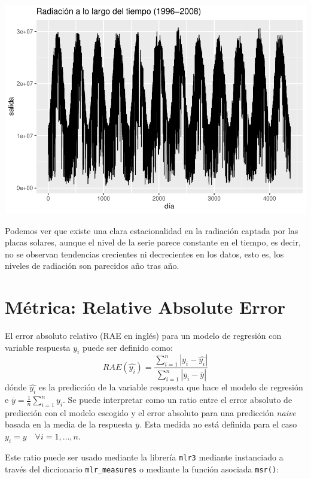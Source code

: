\documentclass[
  11pt,
  a4paper,
]{article}
\newenvironment{Shaded}{\begin{snugshade}}{\end{snugshade}}
\newcommand{\FunctionTok}[1]{\textcolor[rgb]{0.00,0.00,0.00}{#1}}
\newcommand{\NormalTok}[1]{#1}
\newcommand{\OtherTok}[1]{\textcolor[rgb]{0.56,0.35,0.01}{#1}}
\newcommand{\SpecialCharTok}[1]{\textcolor[rgb]{0.00,0.00,0.00}{#1}}
\newcommand{\StringTok}[1]{\textcolor[rgb]{0.31,0.60,0.02}{#1}}
\begin{document}
\includegraphics{memoria_practica_1_files/figure-latex/unnamed-chunk-9-1.pdf}

Podemos ver que existe una clara estacionalidad en la radiación captada
por las placas solares, aunque el nivel de la serie parece constante en
el tiempo, es decir, no se observan tendencias crecientes ni
decrecientes en los datos, esto es, los niveles de radiación son
parecidos año tras año.

\section{Métrica: Relative Absolute Error}

El error absoluto relativo (RAE en inglés) para un modelo de regresión
con variable respuesta \(y_i\) puede ser definido como: \[
RAE(\hat{y_i}) = \frac{\sum_{i=1}^n |y_i - \hat{y_i}|}{\sum_{i=1}^n |y_i - \overline{y}|}
\] dónde \(\hat{y_i}\) es la predicción de la variable respuesta que
hace el modelo de regresión e
\(\overline{y} = \frac{1}{n}\sum_{i=1}^n y_i\). Se puede interpretar
como un ratio entre el error absoluto de predicción con el modelo
escogido y el error absoluto para una predicción \emph{naive} basada en
la media de la respuesta \(\overline{y}\). Esta medida no está definida
para el caso \(y_i = y \quad \forall i=1, \dots, n\).

Este ratio puede ser usado mediante la librería \texttt{mlr3} mediante
instanciado a través del diccionario \texttt{mlr\_measures} o mediante
la función asociada \texttt{msr()}:

\begin{Shaded}
\end{Shaded}
\end{document}
